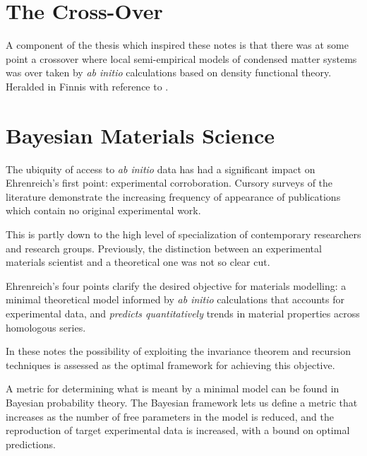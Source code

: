 \section{The Cross-Over}
A component of the thesis which inspired these notes is 
that there was at some point a crossover where local semi-empirical
models of condensed matter systems was over taken by {\it ab initio} 
calculations based on density functional theory. 
Heralded in Finnis \cite{andersen89}  with reference to \cite{payne87}.

\section{Bayesian Materials Science}
The ubiquity of access to {\it ab initio} data has had a significant impact on 
Ehrenreich's first point: experimental corroboration. 
Cursory surveys of the literature demonstrate the increasing frequency of 
appearance of publications which contain no original experimental work. 

This is partly down to the high level of specialization of contemporary 
researchers and research groups. Previously, the distinction between
an experimental materials scientist and a theoretical one was not so clear cut. 

Ehrenreich's four points clarify the desired objective for materials modelling:
a minimal theoretical model informed by {\it ab initio} calculations that accounts for 
experimental data, and {\it predicts quantitatively} trends in material properties
across homologous series. 

In these notes the possibility of exploiting the invariance theorem 
and recursion techniques is assessed as the optimal framework
for achieving this objective. 

A metric for determining what is meant by a minimal model
can be found in Bayesian probability theory. The Bayesian framework 
lets us define a metric that increases as the number of free 
parameters in the model is reduced, and the reproduction of 
target experimental data is increased, with a bound on optimal predictions.

